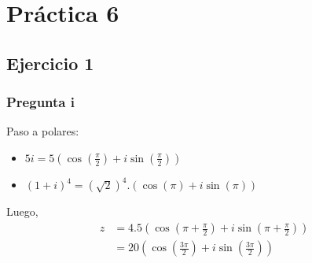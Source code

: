 
\usepackage{caratula}
\usepackage{enumerate}
\usepackage{hyperref}
\usepackage{graphicx}
\usepackage{amsfonts}
\usepackage{enumitem}
\usepackage{amsmath}

\decimalpoint
\hypersetup{colorlinks=true, linkcolor=black, urlcolor=blue}
\setlength{\parindent}{0em}
\setlength{\parskip}{0.5em}
\setcounter{tocdepth}{2} %
\setcounter{section}{5} %
\renewcommand{\thesubsubsection}{\thesubsection.\Alph{subsubsection}}
\graphicspath{ {images/} }





\maketitle
\newpage

\tableofcontents
\newpage

\section{Práctica 6}

\subsection{Ejercicio 1}

\subsubsection{Pregunta i}

Paso a polares:
\begin{itemize}
    \item $ 5i = 5(\cos(\frac{\pi}{2}) + i\sin(\frac{\pi}{2})) $
    \item $ (1+i)^4 = (\sqrt{2})^4 .(\cos(\pi)+i\sin(\pi)) $
\end{itemize}

Luego,
\begin{align*}
    z &= 4.5(\cos(\pi + \frac{\pi}{2})+i\sin(\pi +\frac{\pi}{2})) \\
    &= 20(\cos(\frac{3\pi}{2})+i\sin(\frac{3\pi}{2})) \\
\end{align*}

